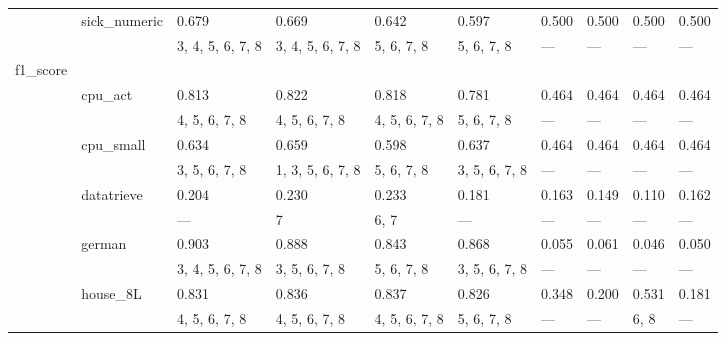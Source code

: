 \documentclass{article}
\begin{document}
\begin{center}
\begin{longtable}{p{1.2cm}p{1.8cm}p{1cm}p{1cm}p{1cm}p{1cm}p{1cm}p{1cm}p{1cm}p{1cm}}
             & sick\_numeric & 0.679            & 0.669            & 0.642            & 0.597            & 0.500      & 0.500         & 0.500         & 0.500         \\
             &              & 3, 4, 5, 6, 7, 8 & 3, 4, 5, 6, 7, 8 & 5, 6, 7, 8       & 5, 6, 7, 8       & ---        & ---           & ---           & ---           \\
 f1\_score    &              &                  &                  &                  &                  &            &               &               &               \\
             & cpu\_act      & 0.813            & 0.822            & 0.818            & 0.781            & 0.464      & 0.464         & 0.464         & 0.464         \\
             &              & 4, 5, 6, 7, 8    & 4, 5, 6, 7, 8    & 4, 5, 6, 7, 8    & 5, 6, 7, 8       & ---        & ---           & ---           & ---           \\
             & cpu\_small    & 0.634            & 0.659            & 0.598            & 0.637            & 0.464      & 0.464         & 0.464         & 0.464         \\
             &              & 3, 5, 6, 7, 8    & 1, 3, 5, 6, 7, 8 & 5, 6, 7, 8       & 3, 5, 6, 7, 8    & ---        & ---           & ---           & ---           \\
             & datatrieve   & 0.204            & 0.230            & 0.233            & 0.181            & 0.163      & 0.149         & 0.110         & 0.162         \\
             &              & ---              & 7                & 6, 7             & ---              & ---        & ---           & ---           & ---           \\
             & german       & 0.903            & 0.888            & 0.843            & 0.868            & 0.055      & 0.061         & 0.046         & 0.050         \\
             &              & 3, 4, 5, 6, 7, 8 & 3, 5, 6, 7, 8    & 5, 6, 7, 8       & 3, 5, 6, 7, 8    & ---        & ---           & ---           & ---           \\
             & house\_8L     & 0.831            & 0.836            & 0.837            & 0.826            & 0.348      & 0.200         & 0.531         & 0.181         \\
             &              & 4, 5, 6, 7, 8    & 4, 5, 6, 7, 8    & 4, 5, 6, 7, 8    & 5, 6, 7, 8       & ---        & ---           & 6, 8          & ---           \\

\end{longtable}
\end{center}
\end{document}
